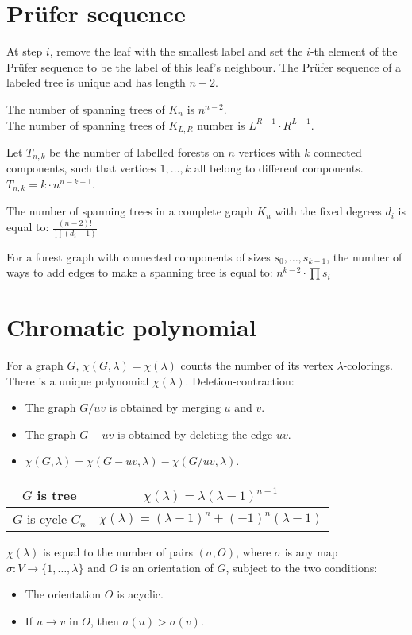 \section*{Prüfer sequence}
At step $i$, remove the leaf with the smallest label and set the $i$-th
element of the Prüfer sequence to be the label of this leaf's neighbour.
The Prüfer sequence of a labeled tree is unique and has length $n - 2$.

The number of spanning trees of $K_n$ is $n^{n - 2}$.\\
The number of spanning trees of $K_{L, R}$ number is $L^{R - 1} \cdot R^{L - 1}$.

Let $T_{n, k}$ be the number of labelled forests on $n$ vertices with $k$ connected components,
such that vertices $1, \dots, k$ all belong to different components.
$T_{n,k} = k \cdot n^{n - k - 1}$.

The number of spanning trees in a complete graph $K_{n}$ with the fixed degrees
$d_{i}$ is equal to:
$ \frac{(n - 2)!}{\prod(d_i - 1)} $

For a forest graph with connected components of sizes $s_0, \dots, s_{k - 1}$, 
the number of ways to add edges to make a spanning tree is equal to:
$ n^{k - 2} \cdot \prod s_i$

\section*{Chromatic polynomial}
For a graph $G$, $\chi(G, \lambda) = \chi(\lambda)$ counts the number of its vertex $\lambda$-colorings.
There is a unique polynomial $\chi(\lambda)$. Deletion-contraction:
\begin{itemize}
\item The graph $G/uv$ is obtained by merging $u$ and $v$.
\item The graph $G - uv$ is obtained by deleting the edge $uv$.
\item $\chi(G, \lambda) = \chi(G - uv, \lambda) - \chi(G/uv, \lambda)$. 
\end{itemize}

\begin{tabular}{|c|c|}
\hline
$G$ is tree & $\chi(\lambda) = \lambda(\lambda - 1)^{n - 1}$ \\
\hline
$G$ is cycle $C_n$ & $\chi(\lambda) = (\lambda - 1)^n + (-1)^n(\lambda - 1)$\\
\hline
\end{tabular} 
 
\begin{proposition}
    $\chi(\lambda)$ is equal to the number of pairs $(\sigma, O)$, 
    where $\sigma$ is any map $\sigma : V \rightarrow \{1, \dots, \lambda\}$ and $O$ is an orientation of $G$, 
    subject to the two conditions:
    \begin{itemize}
        \item The orientation $O$ is acyclic.
        \item If $u \rightarrow v$ in $O$, then $\sigma (u) > \sigma (v)$.
    \end{itemize}
\end{proposition}

